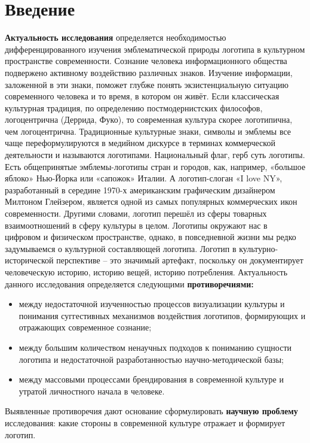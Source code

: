 \section*{Введение}

\textbf{Актуальность исследования} определяется необходимостью дифференцированного изучения эмблематической природы логотипа в культурном пространстве современности. Сознание человека информационного общества подвержено активному воздействию различных знаков. Изучение информации, заложенной в эти знаки, поможет глубже понять экзистенциальную ситуацию современного человека и то время, в котором он живёт. Если классическая культурная традиция, по определению постмодернистских философов, логоцентрична (Деррида, Фуко), то современная культура скорее логотипична, чем логоцентрична. Традиционные культурные знаки, символы и эмблемы все чаще переформулируются в медийном дискурсе в терминах коммерческой деятельности и называются логотипами. Национальный флаг, герб суть логотипы. Есть общепринятые эмблемы-логотипы стран и городов, как, например, «большое яблоко» Нью-Йорка или «сапожок» Италии. А логотип-слоган «I love NY», разработанный в середине 1970-х американским графическим дизайнером Милтоном Глейзером, является одной из самых популярных коммерческих икон современности. Другими словами, логотип перешёл из сферы товарных взаимоотношений в сферу культуры в целом. Логотипы окружают нас в цифровом и физическом пространстве, однако, в повседневной жизни мы редко задумываемся о культурной составляющей логотипа. Логотип в культурно-исторической перспективе – это значимый артефакт, поскольку он документирует человеческую историю, историю вещей, историю потребления.
Актуальность данного исследования определяется следующими \textbf{противоречиями:}
\begin{itemize}
\item между недостаточной изученностью процессов визуализации культуры и понимания суггестивных механизмов воздействия логотипов, формирующих и отражающих современное сознание;
\item между большим количеством ненаучных подходов к пониманию сущности логотипа и недостаточной разработанностью научно-методической базы;
\item между массовыми процессами брендирования в современной культуре и утратой личностного начала в человеке.
\end{itemize}
Выявленные противоречия дают основание сформулировать \textbf{научную проблему} исследования: какие стороны в современной культуре отражает и формирует логотип.

